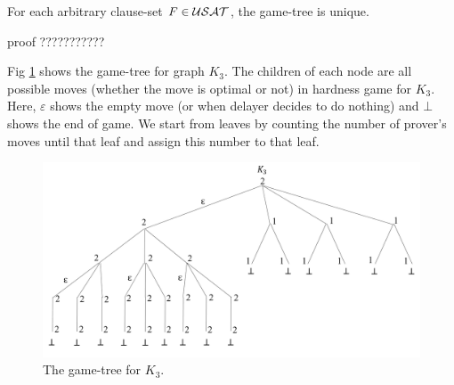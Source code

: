 \documentclass[]{book}
\begin{document}
\begin{lem}\label{lem:game2}
For each arbitrary clause-set $F \in \mathcal{USAT}$, the game-tree is unique.
\end{lem}
proof ???????????
\begin{examp}\label{exp:gg1}
Fig \ref{fig:gg1} shows the game-tree for graph $K_3$. The children of each node are all possible moves (whether the move is optimal or not) in hardness game for $K_3$. Here, $\varepsilon $ shows the empty move (or when delayer decides to do nothing) and $\bot$ shows the end of game. We start from leaves by counting the number of prover's moves until that leaf and assign this number to that leaf. 
\begin{figure}
\begin{center}
\includegraphics[scale =0.45]{gg1.png}
 \caption{The game-tree for $K_3$.}
\label{fig:gg1}
\end{center}
\end{figure}
\end{examp}


\newpage


\end{document}
